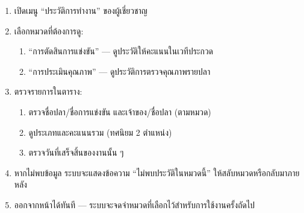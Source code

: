 \par
\begin{sloppypar}
	\begin{enumerate}
		\item เปิดเมนู “ประวัติการทำงาน” ของผู้เชี่ยวชาญ
		\item เลือกหมวดที่ต้องการดู:
		\begin{enumerate}
			\item “การตัดสินการแข่งขัน” — ดูประวัติให้คะแนนในเวทีประกวด
			\item “การประเมินคุณภาพ” — ดูประวัติการตรวจคุณภาพรายปลา
		\end{enumerate}
		\item ตรวจรายการในตาราง:
		\begin{enumerate}
			\item ตรวจชื่อปลา/ชื่อการแข่งขัน และเจ้าของ/ชื่อปลา (ตามหมวด)
			\item ดูประเภทและคะแนนรวม (ทศนิยม 2 ตำแหน่ง)
			\item ตรวจวันที่เสร็จสิ้นของงานนั้น ๆ
		\end{enumerate}
		\item หากไม่พบข้อมูล ระบบจะแสดงข้อความ “ไม่พบประวัติในหมวดนี้” ให้สลับหมวดหรือกลับมาภายหลัง
		\item ออกจากหน้าได้ทันที — ระบบจะจดจำหมวดที่เลือกไว้สำหรับการใช้งานครั้งถัดไป
	\end{enumerate}
\end{sloppypar}